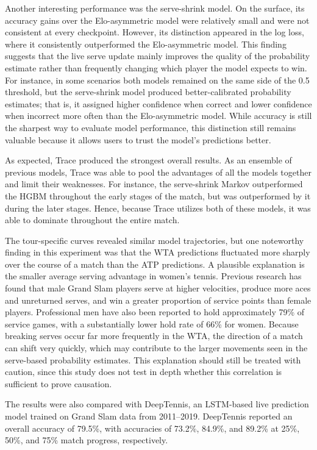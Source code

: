 \documentclass[10pt,twocolumn]{article}
\begin{document}
Another interesting performance was the serve-shrink model. On the surface, its accuracy gains over the Elo-asymmetric model were relatively small and were not consistent at every checkpoint. However, its distinction appeared in the log loss, where it consistently outperformed the Elo-asymmetric model. This finding suggests that the live serve update mainly improves the quality of the probability estimate rather than frequently changing which player the model expects to win. For instance, in some scenarios both models remained on the same side of the 0.5 threshold, but the serve-shrink model produced better-calibrated probability estimates; that is, it assigned higher confidence when correct and lower confidence when incorrect more often than the Elo-asymmetric model. While accuracy is still the sharpest way to evaluate model performance, this distinction still remains valuable because it allows users to trust the model's predictions better.

As expected, Trace produced the strongest overall results. As an ensemble of previous models, Trace was able to pool the advantages of all the models together and limit their weaknesses. For instance, the serve-shrink Markov outperformed the HGBM throughout the early stages of the match, but was outperformed by it during the later stages. Hence, because Trace utilizes both of these models, it was able to dominate throughout the entire match.

The tour-specific curves revealed similar model trajectories, but one noteworthy finding in this experiment was that the WTA predictions fluctuated more sharply over the course of a match than the ATP predictions. A plausible explanation is the smaller average serving advantage in women's tennis. Previous research has found that male Grand Slam players serve at higher velocities, produce more aces and unreturned serves, and win a greater proportion of service points than female players.\cite{reid2016} Professional men have also been reported to hold approximately 79\% of service games, with a substantially lower hold rate of 66\% for women.\cite{goff2025} Because breaking serves occur far more frequently in the WTA, the direction of a match can shift very quickly, which may contribute to the larger movements seen in the serve-based probability estimates. This explanation should still be treated with caution, since this study does not test in depth whether this correlation is sufficient to prove causation.

The results were also compared with DeepTennis,\cite{lerner2019} an LSTM-based live prediction model trained on Grand Slam data from 2011--2019. DeepTennis reported an overall accuracy of 79.5\%, with accuracies of 73.2\%, 84.9\%, and 89.2\% at 25\%, 50\%, and 75\% match progress, respectively.
\end{document}
